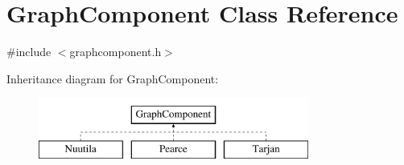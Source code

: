 \hypertarget{class_graph_component}{}\section{Graph\+Component Class Reference}
\label{class_graph_component}


{\ttfamily \#include $<$graphcomponent.\+h$>$}

Inheritance diagram for Graph\+Component\+:\begin{figure}[H]
\begin{center}
\leavevmode
\includegraphics[height=2.000000cm]{class_graph_component}
\end{center}
\end{figure}
